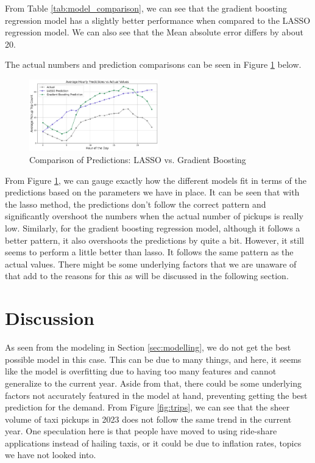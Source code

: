 \documentclass[11pt]{article}
\begin{document}
From Table \ref{tab:model_comparison}, we can see that the gradient boosting regression model has a slightly better performance when compared to the LASSO regression model. We can also see that the Mean absolute error differs by about 20. 

The actual numbers and prediction comparisons can be seen in  Figure \ref{fig:predictions} below.
\begin{figure}[h]
    \includegraphics[width=0.5\textwidth]{plots/predictions.png}
    \centering
    \caption{Comparison of Predictions: LASSO vs. Gradient Boosting}
    \label{fig:predictions}
\end{figure}

From Figure \ref{fig:predictions}, we can gauge exactly how the different models fit in terms of the predictions based on the parameters we have in place. 
It can be seen that with the lasso method, the predictions don’t follow the correct pattern and significantly overshoot the numbers when the actual number of pickups is really low. 
Similarly, for the gradient boosting regression model, although it follows a better pattern, it also overshoots the predictions by quite a bit. However, it still seems to perform a little better than lasso. It follows the same pattern as the actual values. There might be some underlying factors that we are unaware of that add to the reasons for this as will be discussed in the following section.

\section{Discussion}
\label{sec:discussion}
As seen from the modeling in Section \ref{sec:modelling}, we do not get the best possible model in this case. This can be due to many things, and here, it seems like the model is overfitting due to having too many features and cannot generalize to the current year. Aside from that, there could be some underlying factors not accurately featured in the model at hand, preventing getting the best prediction for the demand.
From Figure \ref{fig:trips}, we can see that the sheer volume of taxi pickups in 2023 does not follow the same trend in the current year. One speculation here is that people have moved to using ride-share applications instead of hailing taxis, or it could be due to inflation rates, topics we have not looked into.
\end{document}
